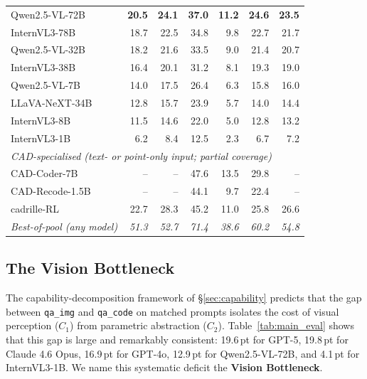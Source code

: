 \documentclass{article}
\begin{document}
\begin{table}[t]
\begin{tabular}{lrrrrrr}
Qwen2.5-VL-72B               & \textbf{20.5} & \textbf{24.1} & \textbf{37.0} & \textbf{11.2} & \textbf{24.6} & \textbf{23.5} \\
InternVL3-78B                & 18.7 & 22.5 & 34.8 & 9.8  & 22.7 & 21.7 \\
Qwen2.5-VL-32B               & 18.2 & 21.6 & 33.5 & 9.0  & 21.4 & 20.7 \\
InternVL3-38B                & 16.4 & 20.1 & 31.2 & 8.1  & 19.3 & 19.0 \\
Qwen2.5-VL-7B                & 14.0 & 17.5 & 26.4 & 6.3  & 15.8 & 16.0 \\
LLaVA-NeXT-34B               & 12.8 & 15.7 & 23.9 & 5.7  & 14.0 & 14.4 \\
InternVL3-8B                 & 11.5 & 14.6 & 22.0 & 5.0  & 12.8 & 13.2 \\
InternVL3-1B                 & 6.2  & 8.4  & 12.5 & 2.3  & 6.7  & 7.2  \\
\midrule
\multicolumn{7}{l}{\emph{CAD-specialised (text- or point-only input; partial coverage)}} \\
CAD-Coder-7B~\citep{Guan2025}        & --   & --   & 47.6 & 13.5 & 29.8 & --  \\
CAD-Recode-1.5B~\citep{Rukhovich2025} & --  & --   & 44.1 & 9.7  & 22.4 & --  \\
cadrille-RL~\citep{Kolodiazhnyi2026}  & 22.7 & 28.3 & 45.2 & 11.0 & 25.8 & 26.6 \\
\midrule
\textit{Best-of-pool (any model)} & \textit{51.3} & \textit{52.7} & \textit{71.4} & \textit{38.6} & \textit{60.2} & \textit{54.8} \\
\bottomrule
\end{tabular}
\end{table}


\subsection{The Vision Bottleneck}
\label{sec:exp_capability}

The capability-decomposition framework of \S\ref{sec:capability} predicts that the gap between \texttt{qa\_img} and \texttt{qa\_code} on matched prompts isolates the cost of visual perception ($C_1$) from parametric abstraction ($C_2$). Table~\ref{tab:main_eval} shows that this gap is large and remarkably consistent: 19.6\,pt for GPT-5, 19.8\,pt for Claude 4.6 Opus, 16.9\,pt for GPT-4o, 12.9\,pt for Qwen2.5-VL-72B, and 4.1\,pt for InternVL3-1B. We name this systematic deficit the \textbf{Vision Bottleneck}.
\end{document}

